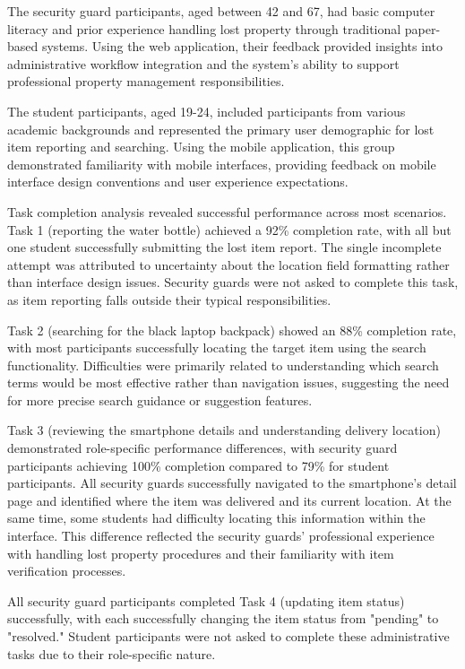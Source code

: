 The security guard participants, aged between 42 and 67, had basic computer literacy and prior experience handling lost property through traditional paper-based systems. Using the web application, their feedback provided insights into administrative workflow integration and the system's ability to support professional property management responsibilities.

The student participants, aged 19-24, included participants from various academic backgrounds and represented the primary user demographic for lost item reporting and searching. Using the mobile application, this group demonstrated familiarity with mobile interfaces, providing feedback on mobile interface design conventions and user experience expectations.

Task completion analysis revealed successful performance across most scenarios. Task 1 (reporting the water bottle) achieved a 92\% completion rate, with all but one student successfully submitting the lost item report. The single incomplete attempt was attributed to uncertainty about the location field formatting rather than interface design issues. Security guards were not asked to complete this task, as item reporting falls outside their typical responsibilities.

Task 2 (searching for the black laptop backpack) showed an 88\% completion rate, with most participants successfully locating the target item using the search functionality. Difficulties were primarily related to understanding which search terms would be most effective rather than navigation issues, suggesting the need for more precise search guidance or suggestion features.

Task 3 (reviewing the smartphone details and understanding delivery location) demonstrated role-specific performance differences, with security guard participants achieving 100\% completion compared to 79\% for student participants. All security guards successfully navigated to the smartphone's detail page and identified where the item was delivered and its current location. At the same time, some students had difficulty locating this information within the interface. This difference reflected the security guards' professional experience with handling lost property procedures and their familiarity with item verification processes.

All security guard participants completed Task 4 (updating item status) successfully, with each successfully changing the item status from "pending" to "resolved." Student participants were not asked to complete these administrative tasks due to their role-specific nature.

